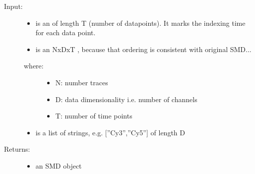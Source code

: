 \documentclass[letterpaper,10pt,english]{sphinxmanual}
\begin{document}
\begin{fulllineitems}
\begin{description}
\begin{itemize}
\end{itemize}

\item[{Input:}] \leavevmode\begin{itemize}
\item {} 
 is an  of length T (number of datapoints). It marks the indexing time for each data point.

\item {} 
 is an NxDxT , because that ordering is consistent with original SMD...

\end{itemize}
\begin{description}
\item[{where: }] \leavevmode\begin{itemize}
\item {} 
N: number traces

\item {} 
D: data dimensionality i.e. number of channels

\item {} 
T: number of time points

\end{itemize}

\end{description}
\begin{itemize}
\item {} 
 is a list of strings, e.g. {[}''Cy3'',''Cy5''{]} of length D

\end{itemize}

\item[{Returns:}] \leavevmode\begin{itemize}
\item {} 
an SMD object

\end{itemize}

\end{description}

\end{fulllineitems}

\end{document}
